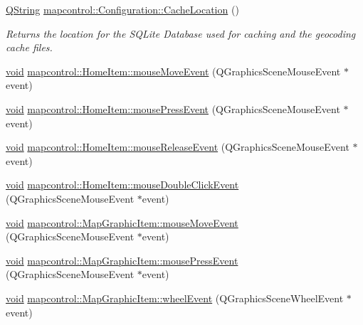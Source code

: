 \begin{DoxyCompactItemize}
\hyperlink{group___u_a_v_objects_plugin_gab9d252f49c333c94a72f97ce3105a32d}{\-Q\-String} \hyperlink{group___o_p_map_widget_ga1edc453f938348b4b2400fe6310bae75}{mapcontrol\-::\-Configuration\-::\-Cache\-Location} ()
\begin{DoxyCompactList}\small\item\em \-Returns the location for the \-S\-Q\-Lite \-Database used for caching and the geocoding cache files. \end{DoxyCompactList}\item 
\hyperlink{group___u_a_v_objects_plugin_ga444cf2ff3f0ecbe028adce838d373f5c}{void} \hyperlink{group___o_p_map_widget_ga547e723911d9f309c53c587dae90002a}{mapcontrol\-::\-Home\-Item\-::mouse\-Move\-Event} (\-Q\-Graphics\-Scene\-Mouse\-Event $\ast$event)
\item 
\hyperlink{group___u_a_v_objects_plugin_ga444cf2ff3f0ecbe028adce838d373f5c}{void} \hyperlink{group___o_p_map_widget_ga312ac9d1cba702ca33ba3f6fbc883bb1}{mapcontrol\-::\-Home\-Item\-::mouse\-Press\-Event} (\-Q\-Graphics\-Scene\-Mouse\-Event $\ast$event)
\item 
\hyperlink{group___u_a_v_objects_plugin_ga444cf2ff3f0ecbe028adce838d373f5c}{void} \hyperlink{group___o_p_map_widget_gabab0d6bb38eaad0414451df469b7dee2}{mapcontrol\-::\-Home\-Item\-::mouse\-Release\-Event} (\-Q\-Graphics\-Scene\-Mouse\-Event $\ast$event)
\item 
\hyperlink{group___u_a_v_objects_plugin_ga444cf2ff3f0ecbe028adce838d373f5c}{void} \hyperlink{group___o_p_map_widget_ga422b8f29836c5a4bafc485a6330408d8}{mapcontrol\-::\-Home\-Item\-::mouse\-Double\-Click\-Event} (\-Q\-Graphics\-Scene\-Mouse\-Event $\ast$event)
\item 
\hyperlink{group___u_a_v_objects_plugin_ga444cf2ff3f0ecbe028adce838d373f5c}{void} \hyperlink{group___o_p_map_widget_ga60c7e55c1ee2c957be5233e999912521}{mapcontrol\-::\-Map\-Graphic\-Item\-::mouse\-Move\-Event} (\-Q\-Graphics\-Scene\-Mouse\-Event $\ast$event)
\item 
\hyperlink{group___u_a_v_objects_plugin_ga444cf2ff3f0ecbe028adce838d373f5c}{void} \hyperlink{group___o_p_map_widget_ga6f27143f563d9f5bb72d36e06078f488}{mapcontrol\-::\-Map\-Graphic\-Item\-::mouse\-Press\-Event} (\-Q\-Graphics\-Scene\-Mouse\-Event $\ast$event)
\item 
\hyperlink{group___u_a_v_objects_plugin_ga444cf2ff3f0ecbe028adce838d373f5c}{void} \hyperlink{group___o_p_map_widget_ga93a150c4f1ed84aa194b153b55bc9cd3}{mapcontrol\-::\-Map\-Graphic\-Item\-::wheel\-Event} (\-Q\-Graphics\-Scene\-Wheel\-Event $\ast$event)

\end{DoxyCompactItemize}
